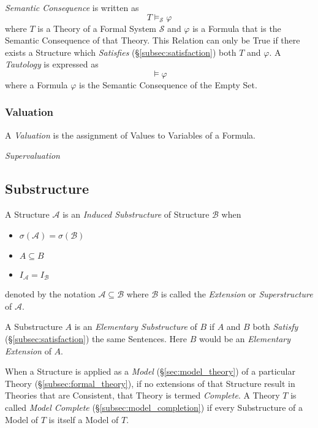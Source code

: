 \documentclass{article}
\begin{document}
\emph{Semantic Consequence} is written as
\[
    T \vDash_{\mathcal{S}} \varphi
\]
where $T$ is a Theory of a Formal System $\mathcal{S}$ and $\varphi$
is a Formula that is the Semantic Consequence of that Theory. This
Relation can only be True if there exists a Structure which
\emph{Satisfies} (\S\ref{subsec:satisfaction}) both $T$ and
$\varphi$. A \emph{Tautology} is expressed as
\[
    \vDash {\varphi}
\]
where a Formula $\varphi$ is the Semantic Consequence of the Empty
Set.



\subsubsection{Valuation}\label{subsec:model_valuation}

A \emph{Valuation} is the assignment of Values to Variables of a
Formula.

\emph{Supervaluation}



\subsection{Substructure}\label{subsec:model_substructure}

A Structure $\mathcal{A}$ is an \emph{Induced Substructure} of
Structure $\mathcal{B}$ when
\begin{itemize}
\item $\sigma(\mathcal{A}) = \sigma(\mathcal{B})$
\item $A \subseteq B$
\item $I_{\mathcal{A}}=I_{\mathcal{B}}$
\end{itemize}
denoted by the notation $\mathcal{A} \subseteq \mathcal{B}$ where
$\mathcal{B}$ is called the \emph{Extension} or \emph{Superstructure}
of $\mathcal{A}$.

A Substructure $A$ is an \emph{Elementary Substructure} of $B$ if $A$
and $B$ both \emph{Satisfy} (\S\ref{subsec:satisfaction}) the same
Sentences. Here $B$ would be an \emph{Elementary Extension} of $A$.

When a Structure is applied as a \emph{Model}
(\S\ref{sec:model_theory}) of a particular Theory
(\S\ref{subsec:formal_theory}), if no extensions of that Structure
result in Theories that are Consistent, that Theory is termed
\emph{Complete}. A Theory $T$ is called \emph{Model Complete}
(\S\ref{subsec:model_completion}) if every Substructure of a Model of
$T$ is itself a Model of $T$.
\end{document}
